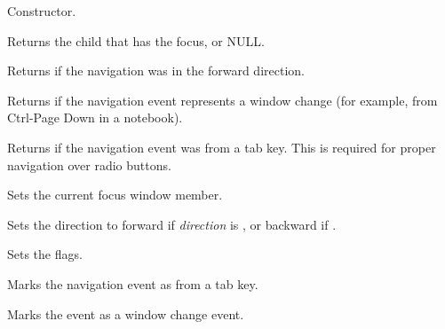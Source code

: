 Constructor.

\label{wxnavigationkeyeventgetcurrentfocus}


Returns the child that has the focus, or NULL.

\label{wxnavigationkeyeventgetdirection}


Returns \true if the navigation was in the forward direction.

\label{wxnavigationkeyeventiswindowchange}


Returns \true if the navigation event represents a window change (for example, from Ctrl-Page Down
in a notebook).

\label{wxnavigationkeyeventisfromtab}


Returns \true if the navigation event was from a tab key. This is required for proper navigation over radio buttons.

\label{wxnavigationkeyeventsetcurrentfocus}


Sets the current focus window member.

\label{wxnavigationkeyeventsetdirection}


Sets the direction to forward if {\it direction} is \true, or backward if \false.

\label{wxnavigationkeyeventsetflags}


Sets the flags.

\label{wxnavigationkeyeventsetfromtab}


Marks the navigation event as from a tab key.

\label{wxnavigationkeyeventsetwindowchange}


Marks the event as a window change event.

